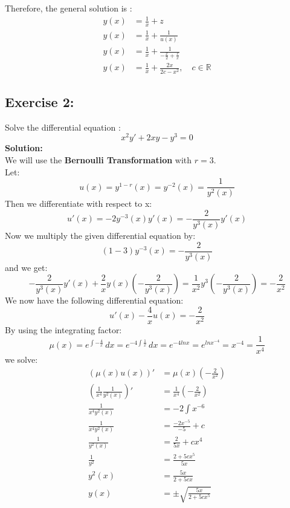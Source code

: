 \documentclass{article}
\begin{document}
Therefore, the general solution is :
\begin{align*}
    y(x) &= \frac{1}{x}+z \\
    y(x) &= \frac{1}{x}+\frac{1}{u(x)} \\
    y(x) &= \frac{1}{x}+\frac{1}{-\frac{x}{2}+\frac{c}{x}} \\ 
    y(x) &= \frac{1}{x}+\frac{2x}{2c-x^2} ,\quad c \in \mathbb{R}
\end{align*}

\newpage

\subsection{Exercise 2:}
Solve the differential equation :
$$x^2y'+2xy-y^3 = 0$$ 
\textbf{Solution:} \\
We will use the \textbf{Bernoulli Transformation} with $r = 3$. \\
Let: $$u(x) = y^{1-r}(x) = y^{-2}(x) = \frac{1}{y^{2}(x)}$$ 
Then we differentiate with respect to x:
$$ u'(x) = -2y^{-3}(x)y'(x) = -\frac{2}{y^3(x)}y'(x) $$
Now we multiply the given differential equation by:
$$(1-3)y^{-3}(x) = -\frac{2}{y^3(x)}$$
and we get:
$$-\frac{2}{y^3(x)}y'(x)+\frac{2}{x}y(x)\left(-\frac{2}{y^3(x)}\right) = \frac{1}{x^2}y^3\left(-\frac{2}{y^3(x)}\right) = -\frac{2}{x^2}$$
We now have the following differential equation:
$$u'(x)-\frac{4}{x}u(x) = -\frac{2}{x^2}$$
By using the integrating factor:
$$μ(x) = e^{\int-\frac{4}{x}}\,dx = e^{-4\int\frac{1}{x}}\,dx = e^{-4lnx} = e^{lnx^{-4}} = x^{-4} = \frac{1}{x^4} $$
we solve:
\begin{align*}
    (μ(x)u(x))' &= μ(x)\left(-\frac{2}{x^2}\right) \\
    \left(\frac{1}{x^4}\frac{1}{y^2(x)}\right)' &= \frac{1}{x^4}\left(-\frac{2}{x^2}\right) \\
    \frac{1}{x^4y^2(x)} &= -2\int x^{-6} \\
    \frac{1}{x^4y^2(x)} &= \frac{-2x^{-5}}{-5}+c \\
    \frac{1}{y^2(x)} &= \frac{2}{5x}+cx^4 \\
    \frac{1}{y^2} &= \frac{2+5cx^5}{5x} \\
    y^2(x) &= \frac{5x}{2+5cx} \\
    y(x) &= \pm\sqrt{\frac{5x}{2+5cx^5}}
\end{align*}

\newpage
\end{document}

